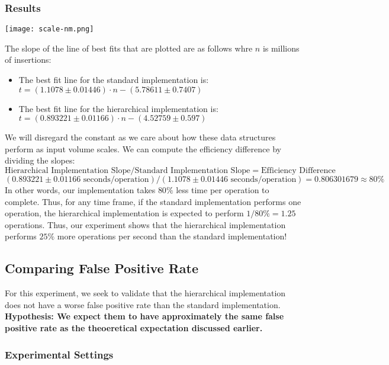 \subsubsection{Results}
\begin{center}
    \texttt{[image: scale-nm.png]}
\end{center}
The slope of the line of best fits that are plotted are as follows whre $n$ is millions of insertions:
\begin{itemize}
    \item The best fit line for the standard implementation is: $t = (1.1078 \pm 0.01446 )\cdot n - (5.78611   \pm 0.7407)$
    \item The best fit line for the hierarchical implementation is: $t = (0.893221 \pm 0.01166 )\cdot n - (4.52759 \pm 0.597 )$
\end{itemize}
We will disregard the constant as we care about how these data structures perform as input volume scales. We can compute the efficiency difference by dividing the slopes:
$$\text{Hierarchical Implementation Slope}/ \text{Standard Implementation Slope} = \text{Efficiency Difference}$$
$$(0.893221 \pm 0.01166 \text{ seconds/operation}) / (1.1078 \pm 0.01446 \text{ seconds/operation}) = 0.806301679 \approx 80\%$$
In other words, our implementation takes $80\%$ less time per operation to complete. 
Thus, for any time frame, if the standard implementation performs one operation, the hierarchical implementation is expected to perform $1/80\% = 1.25$ operations.
Thus, our experiment shows that the hierarchical implementation performs $25\%$ more operations per second than the standard implementation!


\subsection{Comparing False Positive Rate}

For this experiment, we seek to validate that the hierarchical implementation does not have a worse false positive rate than the standard implementation.
\textbf{Hypothesis: We expect them to have approximately the same false positive rate as the theoeretical expectation discussed earlier.}

\subsubsection{Experimental Settings}

